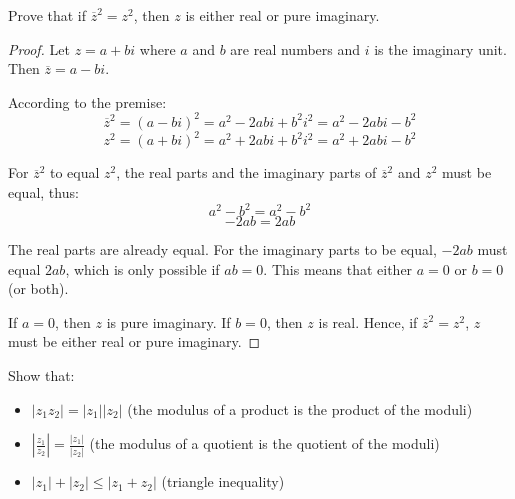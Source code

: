 \documentclass[
	12pt, %
	fleqn, %
	a4paper, %
]{LegrandOrangeBook}
\begin{document}
    \begin{exercise}
        Prove that if \( \overline{z}^2 = z^2 \), then \( z \) is either real or pure imaginary.
        \end{exercise}
        
        \begin{proof}
        Let \( z = a + bi \) where \( a \) and \( b \) are real numbers and \( i \) is the imaginary unit. Then \( \overline{z} = a - bi \). 
        
        According to the premise:
        \[ \overline{z}^2 = (a - bi)^2 = a^2 - 2abi + b^2i^2 = a^2 - 2abi - b^2 \]
        \[ z^2 = (a + bi)^2 = a^2 + 2abi + b^2i^2 = a^2 + 2abi - b^2 \]
        
        For \( \overline{z}^2 \) to equal \( z^2 \), the real parts and the imaginary parts of \( \overline{z}^2 \) and \( z^2 \) must be equal, thus:
        \[ a^2 - b^2 = a^2 - b^2 \]
        \[ -2ab = 2ab \]
        
        The real parts are already equal. For the imaginary parts to be equal, \( -2ab \) must equal \( 2ab \), which is only possible if \( ab = 0 \). This means that either \( a = 0 \) or \( b = 0 \) (or both).
        
        If \( a = 0 \), then \( z \) is pure imaginary. If \( b = 0 \), then \( z \) is real. Hence, if \( \overline{z}^2 = z^2 \), \( z \) must be either real or pure imaginary.
        \end{proof}

        \begin{exercise}
            Show that:
            \begin{itemize}
                \item$\lvert z_1z_2 \rvert = \lvert z_1 \rvert \lvert z_2 \rvert$ \quad (the modulus of a product is the product of the moduli)
                \item $\left\lvert \frac{z_1}{z_2} \right\rvert = \frac{\lvert z_1 \rvert}{\lvert z_2 \rvert}$ \quad (the modulus of a quotient is the quotient of the moduli)
                \item $\lvert z_1 \rvert + \lvert z_2 \rvert \leq \lvert z_1 + z_2 \rvert$ \quad (triangle inequality)
              \end{itemize}
        \end{exercise}
        
\end{document}
